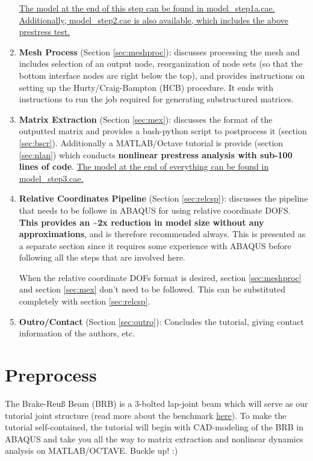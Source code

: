 \documentclass[11pt]{article}
\begin{document}
\begin{enumerate}
\uline{The model at the end of this step can be found in \href{https://github.com/Nidish96/Abaqus4Joints/blob/main/assets/assembly/model\_step1a.cae}{model\_step1a.cae}. Additionally, \href{https://github.com/Nidish96/Abaqus4Joints/blob/main/assets/assembly/model\_step2.cae}{model\_step2.cae} is also available, which includes the above prestress test.}
\item \textbf{Mesh Process} (Section \ref{sec:meshproc}): discusses processing the mesh and includes selection of an output node, reorganization of node sets (so that the bottom interface nodes are right below the top), and provides instructions on setting up the Hurty/Craig-Bampton (HCB) procedure. It ends with instructions to run the job required for generating substructured matrices.
\item \textbf{Matrix Extraction} (Section \ref{sec:mex}): discusses the format of the outputted matrix and provides a bash-python script to postprocess it (section \ref{sec:bscr}). Additionally a MATLAB/Octave tutorial is provide (section \ref{sec:nlan}) which conducts \textbf{nonlinear prestress analysis with sub-100 lines of code}.
\uline{The model at the end of everything can be found in \href{https://github.com/Nidish96/Abaqus4Joints/blob/main/assets/assembly/model\_step3.cae}{model\_step3.cae}.}
\item \textbf{Relative Coordinates Pipeline} (Section \ref{sec:relcsp}): discusses the pipeline that needs to be followe in ABAQUS for using relative coordinate DOFS. \textbf{This provides an \textasciitilde{}2x reduction in model size without any approximations}, and is therefore recommended always.
This is presented as a separate section since it requires some experience with ABAQUS before following all the steps that are involved here.

When the relative coordinate DOFs format is desired, section \ref{sec:meshproc} and section \ref{sec:mex} don't need to be followed. This can be substituted completely with section \ref{sec:relcsp}.
\item \textbf{Outro/Contact} (Section \ref{sec:outro}): Concludes the tutorial, giving contact information of the authors, etc.
\end{enumerate}
\section{Preprocess}
\label{sec:prepro}
The Brake-Reuß Beam (BRB) is a 3-bolted lap-joint beam which will serve as our tutorial joint structure (read more about the benchmark \href{https://jointmechanics.org/index.php/Benchmarks\#The\_Brake-Reu\%C3\%9F\_Beams}{here}).
To make the tutorial self-contained, the tutorial will begin with CAD-modeling of the BRB in ABAQUS and take you all the way to matrix extraction and nonlinear dynamics analysis on MATLAB/OCTAVE.
Buckle up! :)
\end{document}

